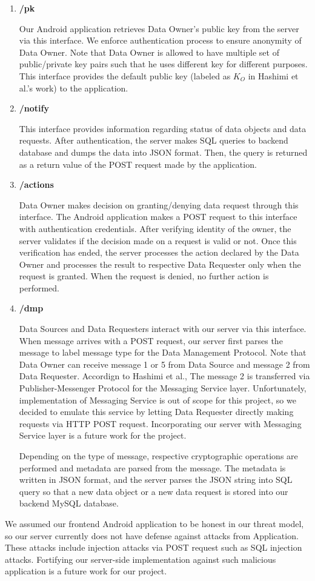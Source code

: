 \begin{enumerate}
    \item \textbf{/pk}

    Our Android application retrieves Data Owner's public key from the server via this interface. We enforce authentication process to ensure anonymity of Data Owner. Note that Data Owner is allowed to have multiple set of public/private key pairs such that he uses different key for different purposes. This interface provides the default public key (labeled as $K_O$ in Hashimi et al.'s work) to the application.

    \item \textbf{/notify}

    This interface provides information regarding status of data objects and data requests. After authentication, the server makes SQL queries to backend database and dumps the data into JSON format. Then, the query is returned as a return value of the POST request made by the application.

    \item \textbf{/actions}

    Data Owner makes decision on granting/denying data request through this interface. The Android application makes a POST request to this interface with authentication credentials. After verifying identity of the owner, the server validates if the decision made on a request is valid or not. Once this verification has ended, the server processes the action declared by the Data Owner and processes the result to respective Data Requester only when the request is granted. When the request is denied, no further action is performed.

    \item \textbf{/dmp}

    Data Sources and Data Requesters interact with our server via this interface. When message arrives with a POST request, our server first parses the message to label message type for the Data Management Protocol. Note that Data Owner can receive message 1 or 5 from Data Source and message 2 from Data Requester. Accordign to Hashimi et al., The message 2 is transferred via Publisher-Messenger Protocol for the Messaging Service layer. Unfortunately, implementation of Messaging Service is out of scope for this project, so we decided to emulate this service by letting Data Requester directly making requests via HTTP POST request. Incorporating our server with Messaging Service layer is a future work for the project.

    Depending on the type of message, respective cryptographic operations are performed and metadata are parsed from the message. The metadata is written in JSON format, and the server parses the JSON string into SQL query so that a new data object or a new data request is stored into our backend MySQL database.
\end{enumerate}

We assumed our frontend Android application to be honest in our threat model, so our server currently does not have defense against attacks from Application. These attacks include injection attacks via POST request such as SQL injection attacks. Fortifying our server-side implementation against such malicious application is a future work for our project.